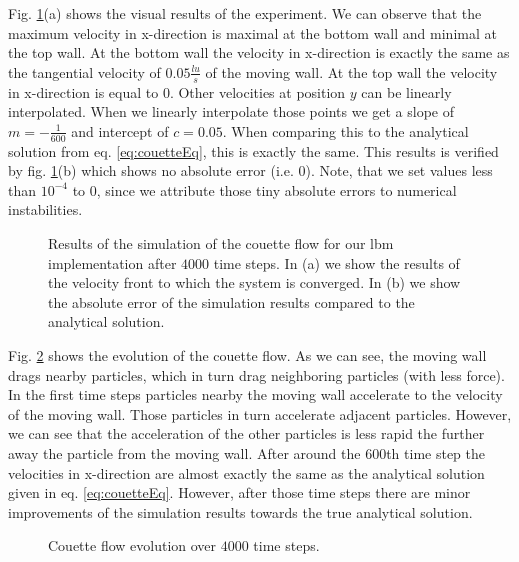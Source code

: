 \documentclass[a4paper,11pt, footsepline]{book}
\begin{document}
Fig. \ref{fig:Couette_vectors}(a) shows the visual results of the experiment. We can observe that the maximum velocity in x-direction is maximal at the bottom wall and minimal at the top wall. At the bottom wall the velocity in x-direction is exactly the same as the tangential velocity of $0.05\frac{lu}{s}$ of the moving wall. At the top wall the velocity in x-direction is equal to $0$. Other velocities at position $y$ can be linearly interpolated. When we linearly interpolate those points we get a slope of $m=-\frac{1}{600}$ and intercept of $c=0.05$. When comparing this to the analytical solution from eq. \ref{eq:couetteEq}, this is exactly the same. This results is verified by fig. \ref{fig:Couette_vectors}(b) which shows no absolute error (i.e. $0$). Note, that we set values less than $10^{-4}$ to $0$, since we attribute those tiny absolute errors to numerical instabilities.
\begin{figure}
  \begin{center}
   \caption{Results of the simulation of the couette flow for our \ac{lbm} implementation after $4000$ time steps. In (a) we show the results of the velocity front to which the system is converged. In (b) we show the absolute error of the simulation results compared to the analytical solution.}
  \label{fig:Couette_vectors}
  \end{center}
\end{figure}

Fig. \ref{fig:Couette_evolution} shows the evolution of the couette flow. As we can see, the moving wall drags nearby particles, which in turn drag neighboring particles (with less force). In the first time steps particles nearby the moving wall accelerate to the velocity of the moving wall. Those particles in turn accelerate adjacent particles. However, we can see that the acceleration of the other particles is less rapid the further away the particle from the moving wall. After around the $600$th time step the velocities in x-direction are almost exactly the same as the analytical solution given in eq. \ref{eq:couetteEq}. However, after those time steps there are minor improvements of the simulation results towards the true analytical solution.
\begin{figure}
  \begin{center}
	\scalebox{0.7}{}
   \caption{Couette flow evolution over $4000$ time steps.}
  \label{fig:Couette_evolution}
  \end{center}
\end{figure}
\end{document}
